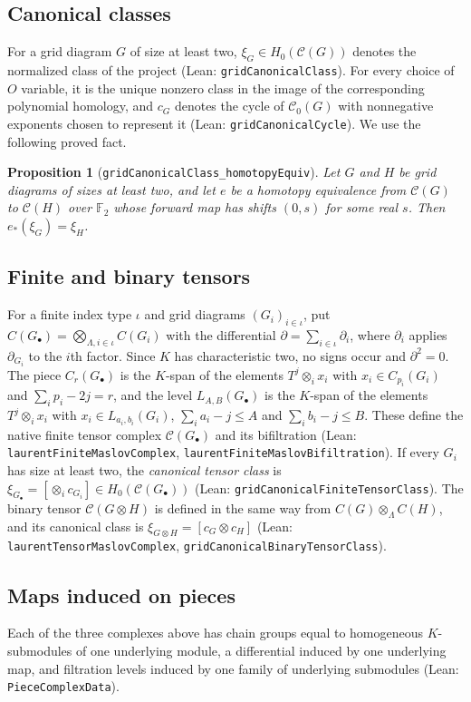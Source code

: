 \documentclass[11pt]{amsart}
\newtheorem{proposition}[theorem]{Proposition}
\theoremstyle{definition}
\theoremstyle{remark}
\newcommand{\lean}[1]{\textnormal{\nolinkurl{#1}}}
\newcommand{\Lam}{\Lambda}
\newcommand{\F}{\mathbb{F}_2}
\newcommand{\cC}{\mathcal{C}}
\newcommand{\Lev}{L}
\begin{document}
\subsection{Canonical classes}
For a grid diagram $G$ of size at least two, $\xi_G\in H_0(\cC(G))$ denotes the normalized class of
the project (Lean: \lean{gridCanonicalClass}). For every choice of $O$ variable, it is the unique
nonzero class in the image of the corresponding polynomial homology, and $c_G$ denotes the cycle of $\cC_0(G)$ with nonnegative exponents chosen to
represent it (Lean: \lean{gridCanonicalCycle}). We use the following proved fact.

\begin{proposition}[\lean{gridCanonicalClass_homotopyEquiv}]\label{prop:class-transport}
Let $G$ and $H$ be grid diagrams of sizes at least two, and let $e$ be a homotopy equivalence
from $\cC(G)$ to $\cC(H)$ over $\F$ whose forward map has shifts $(0,s)$ for some real $s$. Then
$e_*(\xi_G)=\xi_H$.
\end{proposition}

\subsection{Finite and binary tensors}
For a finite index type $\iota$ and grid diagrams $(G_i)_{i\in\iota}$, put
$C(G_\bullet)=\bigotimes_{\Lam,i\in\iota}C(G_i)$ with the differential
$\partial=\sum_{i\in\iota}\partial_i$, where $\partial_i$ applies $\partial_{G_i}$ to the $i$th
factor. Since $K$ has characteristic two, no signs occur and $\partial^2=0$. The piece
$C_r(G_\bullet)$ is the $K$-span of the elements $T^j\otimes_ix_i$ with $x_i\in C_{p_i}(G_i)$ and
$\sum_ip_i-2j=r$, and the level $\Lev_{A,B}(G_\bullet)$ is the $K$-span of the elements
$T^j\otimes_ix_i$ with $x_i\in\Lev_{a_i,b_i}(G_i)$, $\sum_ia_i-j\le A$ and $\sum_ib_i-j\le B$. These
define the native finite tensor complex $\cC(G_\bullet)$ and its bifiltration (Lean:
\lean{laurentFiniteMaslovComplex}, \lean{laurentFiniteMaslovBifiltration}). If every $G_i$ has
size at least two, the \emph{canonical tensor class} is
$\xi_{G_\bullet}=[\otimes_ic_{G_i}]\in H_0(\cC(G_\bullet))$ (Lean:
\lean{gridCanonicalFiniteTensorClass}). The binary tensor $\cC(G\otimes H)$ is defined in the same
way from $C(G)\otimes_\Lam C(H)$, and its canonical class is $\xi_{G\otimes H}=[c_G\otimes c_H]$
(Lean: \lean{laurentTensorMaslovComplex}, \lean{gridCanonicalBinaryTensorClass}).

\subsection{Maps induced on pieces}
Each of the three complexes above has chain groups equal to homogeneous $K$-submodules of one
underlying module, a differential induced by one underlying map, and filtration levels induced by
one family of underlying submodules (Lean: \lean{PieceComplexData}).
\end{document}

